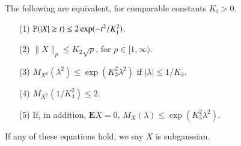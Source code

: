 \begin{theorem}
    The following are equivalent, for comparable constants $K_i > 0$.
    \begin{enumerate}
        \item[(1)] $\operatorname{\mathbb{P}}(|X| \geq t) \leq 2 \exp(-t^2/K_1^2)$.
        \item[(2)] $\| X \|_p \leq K_2 \sqrt{p}$, for $p \in [1,\infty)$.
        \item[(3)] $M_{X^2}(\lambda^2) \leq \exp(K_3^2 \lambda^2)$ if $|\lambda| \leq 1/K_3$.
        \item[(4)] $M_{X^2}(1/K_4^2) \leq 2$.
        \item[(5)] If, in addition, $\mathbf{E} X = 0$, $M_X(\lambda) \leq \exp(K_5^2 \lambda^2)$.
    \end{enumerate}
    If any of these equations hold, we say $X$ is subgaussian.
\end{theorem}
